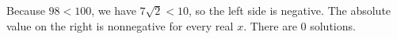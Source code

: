 Because $98<100$, we have $7\sqrt2<10$, so the left side is negative. The absolute value on the right is nonnegative for every real $x$. There are $\boxed{0}$ solutions.

